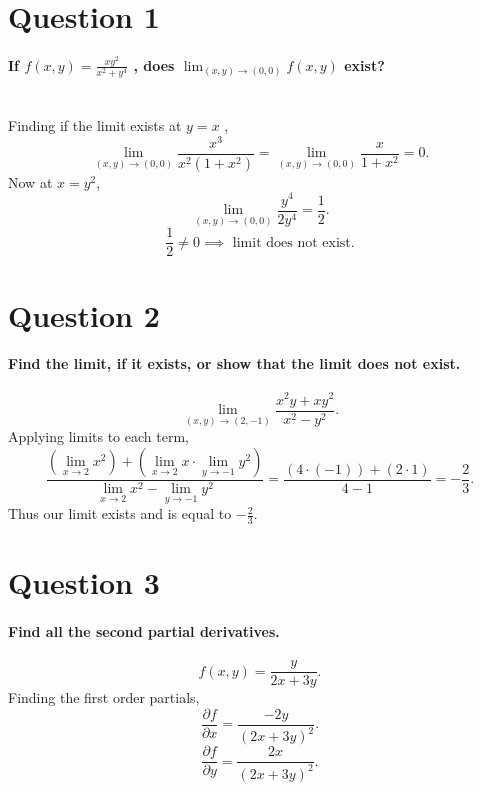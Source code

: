 \section{Question 1}%
\label{sec: Question 1 }
\paragraph{If $ f\left( x,y \right) = \frac{ xy^2 }{ x^2+y^{ 4 } } $ , does $ \lim_{ \left( x,y \right)  \to \left( 0,0 \right) } f\left( x,y \right)  $ exist? \\ \\}
Finding if the limit exists at $ y=x $ ,
\[
\lim_{ \left( x,y \right)  \to \left( 0,0 \right) } \frac{ x^3 }{ x^2\left( 1+x^2 \right)  }= \lim_{ \left( x,y \right)  \to \left( 0,0 \right) } \frac{ x }{ 1+x^2 } =0
.\] 
Now at $ x=y^2 $,
\[
\lim_{ \left( x,y \right)  \to \left( 0,0 \right) } \frac{ y^{ 4 } }{ 2y^{ 4 } } = \frac{ 1 }{ 2 } 
.\] 
\[
\frac{ 1 }{ 2 } \neq 0 \implies \text{ limit does not exist}
.\] 

\section{Question 2}%
\label{sec: Question 2 }
\paragraph{Find the limit, if it exists, or show that the limit does not exist.}
\[
\lim_{ \left( x,y \right)  \to \left( 2,-1 \right) } \frac{ x^2y+xy^2 }{ x^2-y^2 }
.\] 
Applying limits to each term,
\[
\frac{ \left( \displaystyle\lim_{ x \to 2} x^2 \right) + \left( \displaystyle\lim_{ x \to 2} x \cdot \displaystyle\lim_{ y \to -1} y^2 \right)  }{ \displaystyle\lim_{ x \to 2} x^2 - \displaystyle\lim_{ y \to -1} y^2 }= \frac{ \left( 4\cdot \left( -1 \right)  \right) + \left( 2\cdot 1 \right)  }{ 4-1 }= -\frac{ 2 }{ 3 } 
.\] 
Thus our limit exists and is equal to $ -\frac{ 2 }{ 3 } $.

\section{Question 3}%
\label{sec: Question 3 }
\paragraph{Find all the second partial derivatives.}
\[
f\left( x,y \right) = \frac{ y }{ 2x+3y } 
.\] 
Finding the first order partials,
\[
\frac{ \partial f}{\partial x} = \frac{ -2y }{ \left( 2x+3y \right) ^2 }
.\] 
\[
\frac{ \partial f}{\partial y} = \frac{ 2x }{ \left( 2x+3y \right) ^2 }
.\] 

